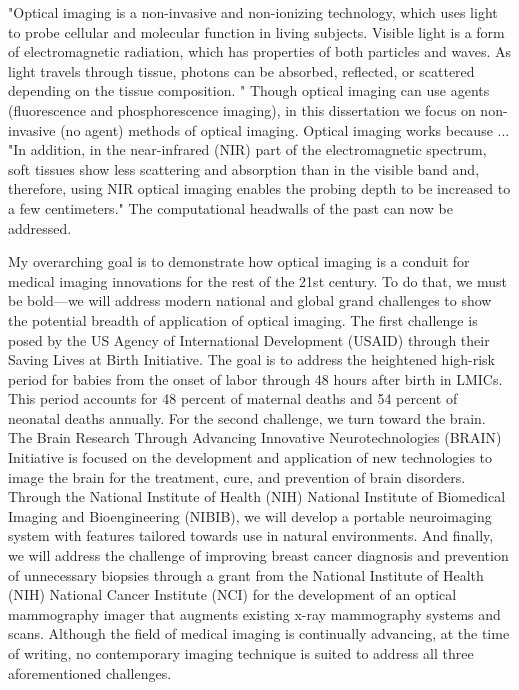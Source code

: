 "Optical imaging is a non-invasive and non-ionizing technology, which uses light to probe cellular and molecular function in living subjects. Visible light is a form of electromagnetic radiation, which has properties of both particles and waves. As light travels through tissue, photons can be absorbed, reflected, or scattered depending on the tissue composition. "  Though optical imaging can use agents (fluorescence and phosphorescence imaging), in this dissertation we focus on non-invasive (no agent) methods of optical imaging. Optical imaging works because ... "In addition, in the near-infrared (NIR) part of the electromagnetic spectrum, soft tissues show less scattering and absorption than in the visible band and, therefore, using NIR optical imaging enables the probing depth to be increased to a few centimeters."  The computational headwalls of the past can now be addressed. 


My overarching goal is to demonstrate how optical imaging is a conduit for medical imaging innovations for the rest of the 21st century. To do that, we must be bold---we will address modern national and global grand challenges to show the potential breadth of application of optical imaging. The first challenge is posed by the US Agency of International Development (USAID) through their Saving Lives at Birth Initiative. The goal is to address the heightened high-risk period for babies from the onset of labor through 48 hours after birth in LMICs. This period accounts for 48 percent of maternal deaths and 54 percent of neonatal deaths annually. For the second challenge, we turn toward the brain. The Brain Research Through Advancing Innovative Neurotechnologies (BRAIN) Initiative is focused on the development and application of new technologies to image the brain for the treatment, cure, and prevention of brain disorders. Through the National Institute of Health (NIH) National Institute of Biomedical Imaging and Bioengineering (NIBIB), we will develop a portable neuroimaging system with features tailored towards use in natural environments. And finally, we will address the challenge of improving breast cancer diagnosis and prevention of unnecessary biopsies through a grant from the National Institute of Health (NIH) National Cancer Institute (NCI) for the development of an optical mammography imager that augments existing x-ray mammography systems and scans. Although the field of medical imaging is continually advancing, at the time of writing, no contemporary imaging technique is suited to address all three aforementioned challenges. 


